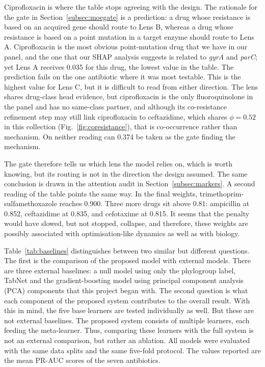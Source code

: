 \documentclass[journal]{IEEEtran}
\begin{document}
Ciprofloxacin is where the table stops agreeing with the design. The rationale for
the gate in Section~\ref{subsec:moegate} is a prediction: a drug whose resistance is
based on an acquired gene should route to Lens B, whereas a drug whose resistance is
based on a point mutation in a target enzyme should route to Lens A. Ciprofloxacin is
the most obvious point-mutation drug that we have in our panel, and the one that our
SHAP analysis suggests is related to \textit{gyrA} and \textit{parC}; yet Lens A
receives 0.035 for this drug, the lowest value in the table. The prediction fails on
the one antibiotic where it was most testable. This is the highest value for Lens C,
but it is difficult to read from either direction. The lens shares drug-class head
evidence, but ciprofloxacin is the only fluoroquinolone in the panel and has no
same-class partner, and although its co-resistance refinement step may still link
ciprofloxacin to ceftazidime, which shares $\phi = 0.52$ in this collection
(Fig.~\ref{fig:coresistance}), that is co-occurrence rather than mechanism. On
neither reading can 0.374 be taken as the gate finding the mechanism.

The gate therefore tells us which lens the model relies on, which is worth knowing,
but its routing is not in the direction the design assumed. The same
conclusion is drawn in the attention audit in Section~\ref{subsec:markers}. A second
reading of the table points the same way. In the final weights,
trimethoprim-sulfamethoxazole reaches 0.900. Three more drugs sit above 0.81:
ampicillin at 0.852, ceftazidime at 0.835, and cefotaxime at 0.815. It seems that the
penalty would have slowed, but not stopped, collapse, and therefore, these weights
are possibly associated with optimisation-like dynamics as well as with biology.

Table~\ref{tab:baselines} distinguishes between two similar but different questions.
The first is the comparison of the proposed model with external models. There are
three external baselines: a null model using only the phylogroup label, TabNet and
the gradient-boosting model using principal component analysis (PCA) components
that this project began with. The
second question is what each component of the proposed system contributes to the
overall result. With this in mind, the five base learners are tested individually as
well. But these are not external baselines. The proposed system consists of multiple
learners, each feeding the meta-learner. Thus, comparing these learners with the full
system is not an external comparison, but rather an ablation. All models were
evaluated with the same data splits and the same five-fold protocol. The values
reported are the mean PR-AUC scores of the seven antibiotics.
\end{document}
